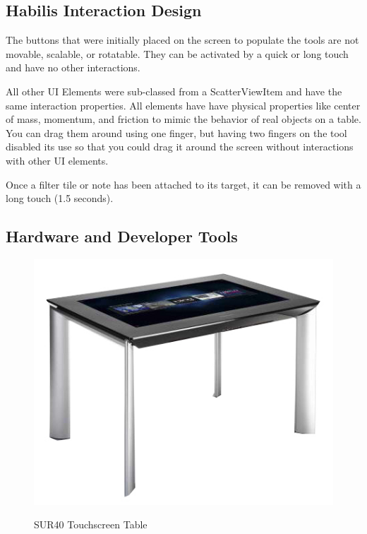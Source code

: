 \documentclass{article}
\begin{document}
\subsection{Habilis Interaction Design}
The buttons that were initially placed on the screen to populate the tools are not movable, scalable, or rotatable.  They can be activated by a quick or long touch and have no other interactions.  

All other UI Elements were sub-classed from a ScatterViewItem and have the same interaction properties.  All elements have have physical properties like center of mass, momentum, and friction to mimic the behavior of real objects on a table.  You can drag them around using one finger, but having two fingers on the tool disabled its use so that you could drag it around the screen without interactions with other UI elements.  

Once a filter tile or note has been attached to its target, it can be removed with a long touch (1.5 seconds).  

\subsection{Hardware and Developer Tools}

\begin{figure}[t!]
\centering
\scalebox{1}
{\includegraphics{SUR40.jpg}}
\caption{SUR40 Touchscreen Table}
\label{Fig:table}
\end{figure}
\end{document}
